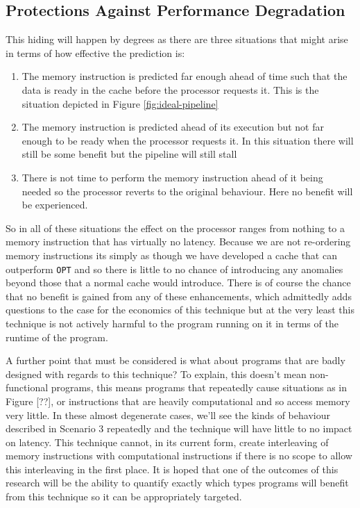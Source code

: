 \subsection{Protections Against Performance Degradation}

This hiding will happen by degrees as there are three situations that might arise in terms of how effective the prediction is:

\begin{enumerate}[label=\textbf{Situation \arabic*}, align=left, leftmargin=*,labelindent=16pt]
	\item The memory instruction is predicted far enough ahead of time such that the data is ready in the cache before the processor requests it. This is the situation depicted in Figure \ref{fig:ideal-pipeline}
	\item The memory instruction is predicted ahead of its execution but not far enough to be ready when the processor requests it. In this situation there will still be some benefit but the pipeline will still stall
	\item There is not time to perform the memory instruction ahead of it being needed so the processor reverts to the original behaviour. Here no benefit will be experienced.
\end{enumerate}

So in all of these situations the effect on the processor ranges from nothing to a memory instruction that has virtually no latency. Because we are not re-ordering memory instructions its simply as though we have developed a cache that can outperform \texttt{OPT} and so there is little to no chance of introducing any anomalies beyond those that a normal cache would introduce. There is of course the chance that no benefit is gained from any of these enhancements, which admittedly adds questions to the case for the economics of this technique but at the very least this technique is not actively harmful to the program running on it in terms of the runtime of the program. 

A further point that must be considered is what about programs that are badly designed with regards to this technique? To explain, this doesn't mean non-functional programs, this means programs that repeatedly cause situations as in Figure [??], or instructions that are heavily computational and so access memory very little. In these almost degenerate cases, we'll see the kinds of behaviour described in Scenario 3 repeatedly and the technique will have little to no impact on latency. This technique cannot, in its current form, create interleaving of memory instructions with computational instructions if there is no scope to allow this interleaving in the first place. It is hoped that one of the outcomes of this research will be the ability to quantify exactly which types programs will benefit from this technique so it can be appropriately targeted. 

